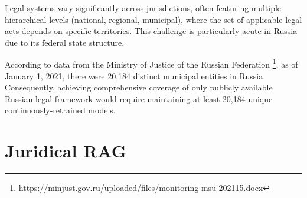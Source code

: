 Legal systems vary significantly across jurisdictions, 
often featuring multiple hierarchical levels (national, regional, municipal), 
where the set of applicable legal acts depends on specific territories. 
This challenge is particularly acute in Russia due to its federal state structure.

According to data from the Ministry of Justice of the Russian Federation \footnote{https://minjust.gov.ru/uploaded/files/monitoring-msu-202115.docx}, 
as of January 1, 2021, there were 20,184 distinct municipal entities in Russia. 
Consequently, achieving comprehensive coverage of only publicly available Russian legal framework
would require maintaining at least 20,184 unique continuously-retrained models.




\section{Juridical RAG}
